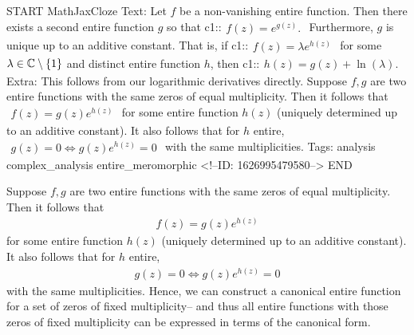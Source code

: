\documentclass{memoir}
\begin{document}
\begin{anki}
START
MathJaxCloze
Text: Let \(f\) be a non-vanishing entire function. Then there exists a second entire function \(g\) so that
{{c1::\(\begin{align*}
        	f(z) = e^{g(z)}.
        \end{align*}\)}}
Furthermore, \(g\) is unique up to an additive constant. That is, if
{{c1::\(\begin{align*}
      	f(z) = \lambda e^{h(z)}
        \end{align*}\)}}
for some \(\lambda \in \mathbb{C}\setminus\left\{ 1 \right\} \) and distinct entire function \(h\), then
{{c1::\(\begin{align*}
      	h(z) = g(z) + \ln(\lambda ).
        \end{align*}\)}}
Extra: This follows from our logarithmic derivatives directly.
Suppose \(f,g\) are two entire functions with the same zeros of equal multiplicity. Then it follows that
\(\begin{align*}
  	f(z) = g(z)e^{h(z)}
  \end{align*}\)
for some entire function \(h(z)\) (uniquely determined up to an additive constant).
It also follows that for \(h\) entire,
\(\begin{align*}
  	g(z) = 0 \iff g(z)e^{h(z)} = 0
  \end{align*}\)
with the same multiplicities.
Tags: analysis complex_analysis entire_meromorphic
<!--ID: 1626995479580-->
END
\end{anki}

Suppose \(f,g\) are two entire functions with the same zeros of equal multiplicity. Then it follows that
\begin{align*}
	f(z) = g(z)e^{h(z)}
\end{align*}
for some entire function \(h(z)\) (uniquely determined up to an additive constant).
It also follows that for \(h\) entire,
\begin{align*}
	g(z) = 0 \iff g(z)e^{h(z)} = 0
\end{align*}
with the same multiplicities.
Hence, we can construct a canonical entire function for a set of zeros of fixed multiplicity-- and thus all entire functions with those zeros of fixed multiplicity can be expressed in terms of the canonical form.\\
\end{document}
